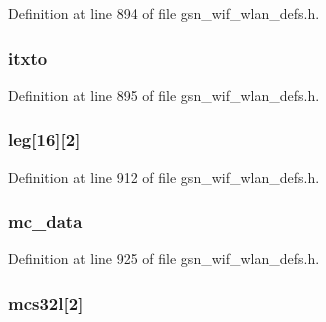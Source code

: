 Definition at line 894 of file gsn\_\-wif\_\-wlan\_\-defs.h.

\hypertarget{a00410_ab6f981da732b49662790618f0a6441f4}{
\subsubsection[{itxto}]{ {\bf itxto}}}
\label{a00410_ab6f981da732b49662790618f0a6441f4}


Definition at line 895 of file gsn\_\-wif\_\-wlan\_\-defs.h.

\hypertarget{a00410_aaf690b30c7bb3b5f1b5675f84c7c92e5}{
\subsubsection[{leg}]{ {\bf leg}\mbox{[}16\mbox{]}\mbox{[}2\mbox{]}}}
\label{a00410_aaf690b30c7bb3b5f1b5675f84c7c92e5}


Definition at line 912 of file gsn\_\-wif\_\-wlan\_\-defs.h.

\hypertarget{a00410_a5b5f1db253e2c61ab11fedd518d5480b}{
\subsubsection[{mc\_\-data}]{ {\bf mc\_\-data}}}
\label{a00410_a5b5f1db253e2c61ab11fedd518d5480b}


Definition at line 925 of file gsn\_\-wif\_\-wlan\_\-defs.h.

\hypertarget{a00410_a6d5ba148df5237ec93937479cad72cd9}{
\subsubsection[{mcs32l}]{ {\bf mcs32l}\mbox{[}2\mbox{]}}}
\label{a00410_a6d5ba148df5237ec93937479cad72cd9}


